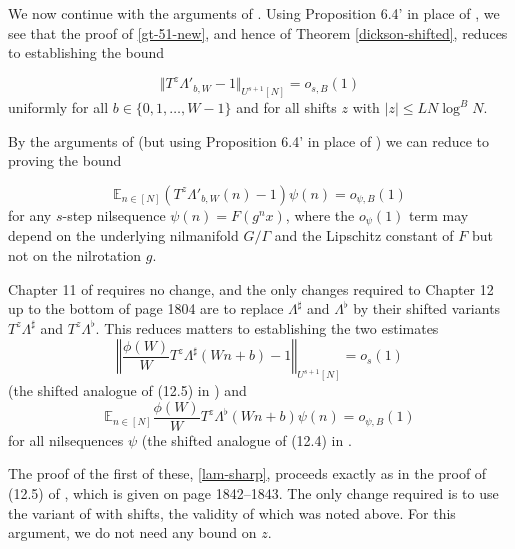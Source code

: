\documentclass[12pt]{amsart}
\numberwithin{equation}{section}  %
\theoremstyle{remark}
\theoremstyle{plain}
\numberwithin{equation}{section}
\newcommand{\E}{\mathbb{E}}  %
\renewcommand{\leq}{\leqslant}
\renewcommand{\(}{\left(}
\renewcommand{\)}{\right)}
\begin{document}
We now continue with the arguments of \cite[Chapter 7]{gt-linearprimes}. Using Proposition 6.4' in place of \cite[Proposition 6.4]{gt-linearprimes}, we see that the proof of \eqref{gt-51-new}, and hence of Theorem \ref{dickson-shifted}, reduces to establishing the bound

\begin{equation*}\label{gowers-shift} \Vert T^z \Lambda'_{b,W} - 1\Vert_{U^{s+1}[N]} = o_{s,B}(1)\end{equation*} uniformly for all $b \in \{0,1,\dots, W-1\}$ and for all shifts $z$ with $|z| \leq LN\log^B N$. 

By the arguments of \cite[Section 10]{gt-linearprimes} (but using Proposition 6.4' in place of \cite[Proposition 6.4]{gt-linearprimes}) we can reduce to proving the bound

\begin{equation*}\label{nil-cor} \E_{n \in [N]} (T^z \Lambda'_{b,W}(n) - 1) \psi(n) = o_{\psi,B}(1)\end{equation*} for any $s$-step nilsequence $\psi(n) = F(g^n x)$, where the $o_{\psi}(1)$ term may depend on the underlying nilmanifold $G/\Gamma$ and the Lipschitz constant of $F$ but not on the nilrotation $g$.

Chapter 11 of \cite{gt-linearprimes} requires no change, and the only changes required to Chapter 12 up to the bottom of page 1804 are to replace $\Lambda^{\sharp}$ and $\Lambda^{\flat}$ by their shifted variants $T^z\Lambda^{\sharp}$ and $T^z\Lambda^{\flat}$. This reduces matters to establishing the two estimates
\begin{equation}\label{lam-sharp} \left\Vert \frac{\phi(W)}{W} T^z\Lambda^{\sharp}(Wn + b) - 1\right\Vert_{U^{s+1}[N]} = o_s(1)  \end{equation} (the shifted analogue of (12.5) in \cite{gt-linearprimes}) 
and
\begin{equation}\label{lam-flat}  \E_{n \in [N]} \frac{\phi(W)}{W} T^z \Lambda^{\flat}(Wn + b) \psi(n) = o_{\psi, B}(1)\end{equation} for all nilsequences $\psi$ (the shifted analogue of (12.4) in \cite{gt-linearprimes}.

The proof of the first of these, \eqref{lam-sharp}, proceeds exactly as in the proof of (12.5) of \cite{gt-linearprimes}, which is given on page 1842--1843. The only change required is to use the variant of \cite[Theorem D.3]{gt-linearprimes} with shifts, the validity of which was noted above. For this argument, we do not need any bound on $z$.
\end{document}
